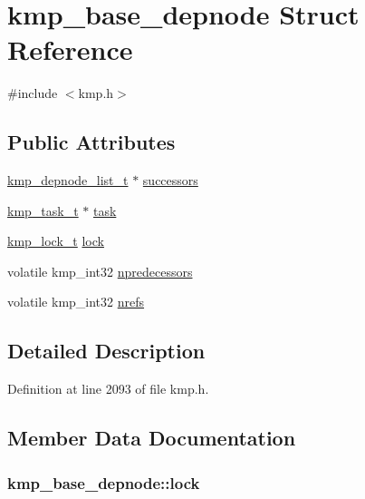 \hypertarget{structkmp__base__depnode}{\section{kmp\-\_\-base\-\_\-depnode Struct Reference}
\label{structkmp__base__depnode}
}


{\ttfamily \#include $<$kmp.\-h$>$}

\subsection*{Public Attributes}
\begin{DoxyCompactItemize}
\item 
\hyperlink{kmp_8h_a877b10d3438c1c7864488165c95be189}{kmp\-\_\-depnode\-\_\-list\-\_\-t} $\ast$ \hyperlink{structkmp__base__depnode_afdece27522eff7b332a209348f2f85e4}{successors}
\item 
\hyperlink{group__BASIC__TYPES_ga2783514e154e897944132a3ba6ed8789}{kmp\-\_\-task\-\_\-t} $\ast$ \hyperlink{structkmp__base__depnode_af23437a6227f2cad37c90e7320d9bdb9}{task}
\item 
\hyperlink{kmp__lock_8h_ad1928c8c2d45f7848000a372ec4fde54}{kmp\-\_\-lock\-\_\-t} \hyperlink{structkmp__base__depnode_ad087d258955483cb697e77f5f8575227}{lock}
\item 
volatile kmp\-\_\-int32 \hyperlink{structkmp__base__depnode_a1b12c30275179b5b16a90959858f2969}{npredecessors}
\item 
volatile kmp\-\_\-int32 \hyperlink{structkmp__base__depnode_a03def393dd90934e18d8d64491919f5e}{nrefs}
\end{DoxyCompactItemize}


\subsection{Detailed Description}


Definition at line 2093 of file kmp.\-h.



\subsection{Member Data Documentation}
\hypertarget{structkmp__base__depnode_ad087d258955483cb697e77f5f8575227}{
\subsubsection[{lock}]{ kmp\-\_\-base\-\_\-depnode\-::lock}}\label{structkmp__base__depnode_ad087d258955483cb697e77f5f8575227}


